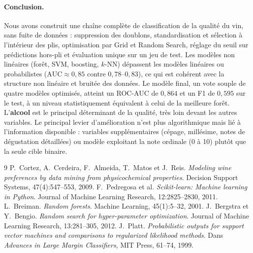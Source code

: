 \documentclass[11pt,a4paper]{article}
\begin{document}
\paragraph{Conclusion.}
Nous avons construit une chaîne complète de classification de la qualité du vin, sans fuite de données : suppression des doublons, standardisation et sélection à l'intérieur des plis, optimisation par Grid et Random Search,
réglage du seuil sur prédictions hors-pli et évaluation unique sur un jeu de test. Les modèles non linéaires (forêt, SVM, boosting, $k$-NN) dépassent les modèles linéaires ou probabilistes ($\text{AUC} \approx 0{,}85$ contre $0{,}78$--$0{,}83$),
ce qui est cohérent avec la structure non linéaire et bruitée des données. Le modèle final, un vote souple de quatre modèles optimisés, atteint un ROC-AUC de $0{,}864$ et un F1 de $0{,}595$ sur le test, à un niveau
statistiquement équivalent à celui de la meilleure forêt. L'\textbf{alcool} est le principal déterminant de la qualité, très loin devant les autres variables. Le principal levier d'amélioration n'est plus algorithmique mais lié à l'information disponible :
variables supplémentaires (cépage, millésime, notes de dégustation détaillées) ou modèle exploitant la note ordinale (0 à 10) plutôt que la seule cible binaire.

\begin{thebibliography}{9}
 P.~Cortez, A.~Cerdeira, F.~Almeida, T.~Matos et J.~Reis. \emph{Modeling wine preferences by data mining from physicochemical properties}. Decision Support Systems, 47(4):547--553, 2009.
 F.~Pedregosa et al. \emph{Scikit-learn: Machine learning in Python}. Journal of Machine Learning Research, 12:2825--2830, 2011.
 L.~Breiman. \emph{Random forests}. Machine Learning, 45(1):5--32, 2001.
 J.~Bergstra et Y.~Bengio. \emph{Random search for hyper-parameter optimization}. Journal of Machine Learning Research, 13:281--305, 2012.
 J.~Platt. \emph{Probabilistic outputs for support vector machines and comparisons to regularized likelihood methods}. Dans \emph{Advances in Large Margin Classifiers}, MIT Press, 61--74, 1999.
\end{thebibliography}
\end{document}
